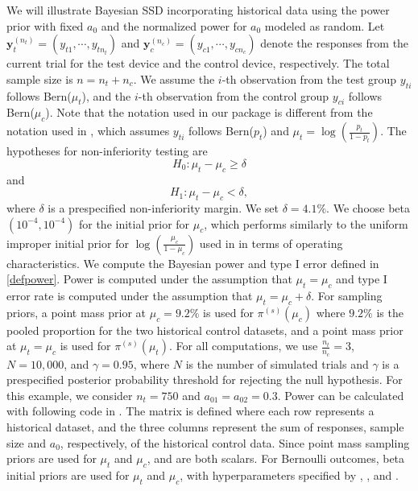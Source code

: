 We will illustrate Bayesian SSD incorporating historical data using the power prior with fixed $a_0$ and the normalized power for $a_0$ modeled as random. Let $\textbf{y}_t^{(n_t)}=(y_{t1},\cdots, y_{tn_t})$ and $\textbf{y}_c^{(n_c)}=(y_{c1},\cdots, y_{cn_c})$ denote the responses from the current trial for the test device and the control device, respectively. The total sample size is $n=n_t+n_c$. We assume the $i$-th observation from the test group $y_{ti}$ follows Bern($\mu_t$), and the $i$-th observation from the control group $y_{ci}$ follows Bern($\mu_c$). Note that the notation used in our package is different from the notation used in \cite{Chen_2011}, which assumes $y_{ti}$ follows Bern($p_t$) and $\mu_t=\log\left(\frac{p_t}{1-p_t}\right)$. The hypotheses for non-inferiority testing are $$H_0: \mu_t - \mu_c \ge \delta$$ and $$H_1: \mu_t - \mu_c < \delta,$$ where $\delta$ is a prespecified non-inferiority margin. We set $\delta=4.1\%$. We choose beta$(10^{-4}, 10^{-4})$ for the initial prior for $\mu_c$, which performs similarly to the uniform improper initial prior for $\log\left(\frac{\mu_c}{1-\mu_c}\right)$ used in \cite{Chen_2011} in terms of operating characteristics. We compute the Bayesian power and type I error defined in \eqref{defpower}. Power is computed under the assumption that $\mu_t=\mu_c$ and type I error rate is computed under the assumption that ${\mu_t=\mu_c+\delta}$. For sampling priors, a point mass prior at $\mu_c = 9.2\%$ is used for $\pi^{(s)}(\mu_c)$ where $9.2\%$ is the pooled proportion for the two historical control datasets, and a point mass prior at $\mu_t = \mu_c$ is used for $\pi^{(s)}(\mu_t)$. For all computations, we use $\frac{n_t}{n_c} = 3$,  $N=10,000$,  and $\gamma=0.95$, where $N$ is the number of simulated trials and $\gamma$ is a prespecified posterior probability threshold for rejecting the null hypothesis. For this example, we consider $n_t=750$ and $a_{01}=a_{02}=0.3$. Power can be calculated with following code in . The  matrix is defined where each row represents a historical dataset, and the three columns represent the sum of responses, sample size and $a_0$, respectively, of the historical control data. Since point mass sampling priors are used for $\mu_t$ and $\mu_c$,  and  are both scalars. For Bernoulli outcomes, beta initial priors are used for $\mu_t$ and $\mu_c$, with hyperparameters specified by , ,  and . 

